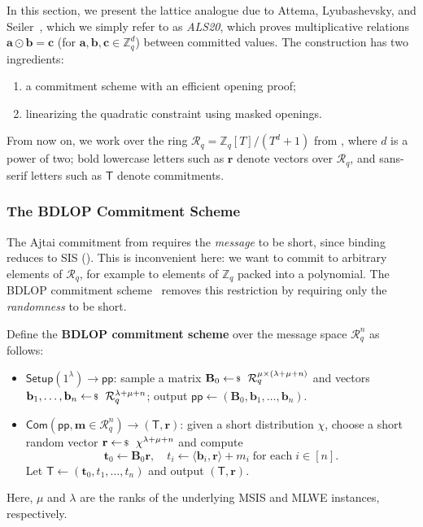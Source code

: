 \documentclass[../../book.tex]{subfiles}
\begin{document}
In this section, we present the lattice analogue due to Attema, Lyubashevsky, and Seiler~\cite{C:AttLyuSei20}, which we simply refer to as \emph{ALS20}, which proves multiplicative relations $\mathbf{a} \odot \mathbf{b} = \mathbf{c}$ (for $\mathbf{a},\mathbf{b},\mathbf{c} \in \mathbb{Z}_q^d$) between committed values.
The construction has two ingredients: 
\begin{enumerate}
    \item a commitment scheme with an efficient opening proof;
    \item linearizing the quadratic constraint using masked openings.
\end{enumerate}

From now on, we work over the ring $\mathcal{R}_q = \mathbb{Z}_q[T]/(T^d+1)$ from , where $d$ is a power of two; bold lowercase letters such as $\mathbf{r}$ denote vectors over $\mathcal{R}_q$, and sans-serif letters such as $\mathsf{T}$ denote commitments.

\subsubsection{The BDLOP Commitment Scheme}

The Ajtai commitment from  requires the \emph{message} to be short, since binding reduces to SIS ().
This is inconvenient here: we want to commit to arbitrary elements of $\mathcal{R}_q$, for example to elements of $\mathbb{Z}_q$ packed into a polynomial.
The BDLOP commitment scheme~\cite{SCN:BDLOP18} removes this restriction by requiring only the \emph{randomness} to be short.

\begin{definition}\label{def:bdlop}
    Define the \textbf{BDLOP commitment scheme} over the message space $\mathcal{R}_q^n$ as follows:
    \begin{itemize}
        \item $\mathsf{Setup}(1^{\lambda}) \to \mathsf{pp}$: sample a matrix $\mathbf{B}_0 \leftarrowS \mathcal{R}_q^{\mu \times (\lambda+\mu+n)}$ and vectors $\mathbf{b}_1, \dots, \mathbf{b}_n \leftarrowS \mathcal{R}_q^{\lambda+\mu+n}$; output $\mathsf{pp} \gets (\mathbf{B}_0, \mathbf{b}_1, \dots, \mathbf{b}_n)$.
        \item $\mathsf{Com}(\mathsf{pp}, \mathbf{m} \in \mathcal{R}_q^n) \to (\mathsf{T}, \mathbf{r})$: given a short distribution $\chi$, choose a short random vector $\mathbf{r} \leftarrowS \chi^{\lambda+\mu+n}$ and compute
        \begin{equation*}
            \mathbf{t}_0 \gets \mathbf{B}_0\mathbf{r}, \quad t_i \gets \langle \mathbf{b}_i, \mathbf{r} \rangle + m_i \; \text{for each} \; i \in [n].
        \end{equation*}
        Let $\mathsf{T} \gets (\mathbf{t}_0, t_1, \dots, t_n)$ and output $(\mathsf{T}, \mathbf{r})$.
    \end{itemize}
    Here, $\mu$ and $\lambda$ are the ranks of the underlying MSIS and MLWE instances, respectively.
\end{definition}
\end{document}

